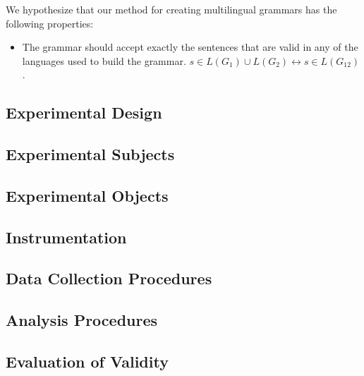 \documentclass[conference,compsoc]{IEEEtran}
\providecommand{\tightlist}{%
  \setlength{\itemsep}{0pt}\setlength{\parskip}{0pt}}
\begin{document}
We hypothesize that our method for creating multilingual grammars has
the following properties:

\begin{itemize}
\tightlist
\item
  The grammar should accept exactly the sentences that are valid in any
  of the languages used to build the grammar.
  \(s \in L(G_1)\cup L(G_2) \leftrightarrow s \in L(G_{12})\).
\end{itemize}

\hypertarget{experimental-design-1}{%
\subsection{Experimental Design}\label{experimental-design-1}}

\hypertarget{experimental-subjects}{%
\subsection{Experimental Subjects}\label{experimental-subjects}}

\hypertarget{experimental-objects}{%
\subsection{Experimental Objects}\label{experimental-objects}}

\hypertarget{instrumentation}{%
\subsection{Instrumentation}\label{instrumentation}}

\hypertarget{data-collection-procedures}{%
\subsection{Data Collection
Procedures}\label{data-collection-procedures}}

\hypertarget{analysis-procedures}{%
\subsection{Analysis Procedures}\label{analysis-procedures}}

\hypertarget{evaluation-of-validity}{%
\subsection{Evaluation of Validity}\label{evaluation-of-validity}}
\end{document}
